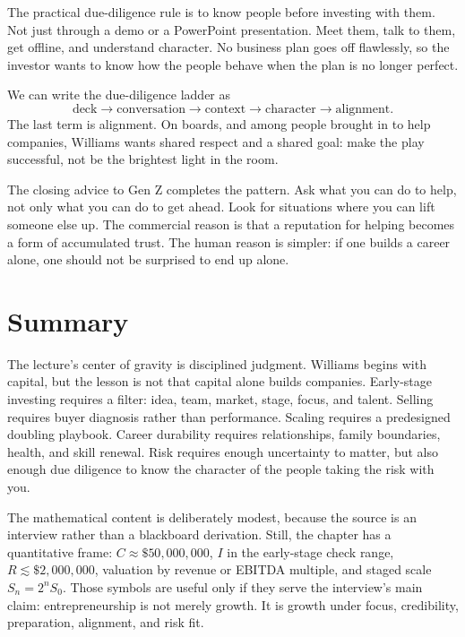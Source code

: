 The practical due-diligence rule is to know people before investing with them. Not just through a demo or a PowerPoint presentation. Meet them, talk to them, get offline, and understand character. No business plan goes off flawlessly, so the investor wants to know how the people behave when the plan is no longer perfect.

We can write the due-diligence ladder as
\begin{equation}
\text{deck}
\longrightarrow
\text{conversation}
\longrightarrow
\text{context}
\longrightarrow
\text{character}
\longrightarrow
\text{alignment}.
\end{equation}
The last term is alignment. On boards, and among people brought in to help companies, Williams wants shared respect and a shared goal: make the play successful, not be the brightest light in the room.

The closing advice to Gen Z completes the pattern. Ask what you can do to help, not only what you can do to get ahead. Look for situations where you can lift someone else up. The commercial reason is that a reputation for helping becomes a form of accumulated trust. The human reason is simpler: if one builds a career alone, one should not be surprised to end up alone.

\section{Summary}

The lecture's center of gravity is disciplined judgment. Williams begins with capital, but the lesson is not that capital alone builds companies. Early-stage investing requires a filter: idea, team, market, stage, focus, and talent. Selling requires buyer diagnosis rather than performance. Scaling requires a predesigned doubling playbook. Career durability requires relationships, family boundaries, health, and skill renewal. Risk requires enough uncertainty to matter, but also enough due diligence to know the character of the people taking the risk with you.

The mathematical content is deliberately modest, because the source is an interview rather than a blackboard derivation. Still, the chapter has a quantitative frame: \(C \approx \$50{,}000{,}000\), \(I\) in the early-stage check range, \(R \lesssim \$2{,}000{,}000\), valuation by revenue or EBITDA multiple, and staged scale \(S_n=2^nS_0\). Those symbols are useful only if they serve the interview's main claim: entrepreneurship is not merely growth. It is growth under focus, credibility, preparation, alignment, and risk fit.